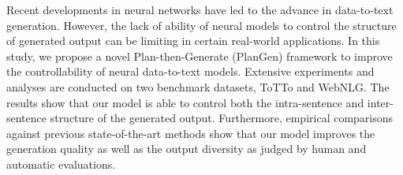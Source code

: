 Recent developments in neural networks have led to the advance in data-to-text generation. However, the lack of ability of neural models to control the structure of generated output can be limiting in certain real-world applications. In this study, we propose a novel Plan-then-Generate (PlanGen) framework to improve the controllability of neural data-to-text models. Extensive experiments and analyses are conducted on two benchmark datasets, ToTTo and WebNLG. The results show that our model is able to control both the intra-sentence and inter-sentence structure of the generated output. Furthermore, empirical comparisons against previous state-of-the-art methods show that our model improves the generation quality as well as the output diversity as judged by human and automatic evaluations.
